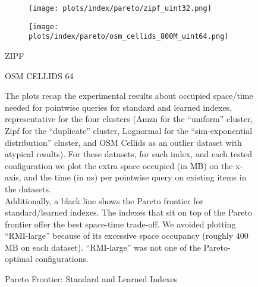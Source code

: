 \documentclass{article}
\begin{document}
\begin{figure}[!htbp]
{\begin{minipage}[t][0.98\textheight][t]{\textwidth}
    \begin{minipage}{0.48\linewidth}
        \begin{figure}[H]
        \texttt{[image: plots/index/pareto/zipf\_uint32.png]}
        \end{figure}
    \end{minipage}
    \begin{minipage}{0.48\linewidth}
        \begin{figure}[H]
        \texttt{[image: plots/index/pareto/osm\_cellids\_800M\_uint64.png]}
        \end{figure}
    \end{minipage}
    \begin{minipage}{0.48\linewidth}
    \begin{center}
        ZIPF
    \end{center}
    \end{minipage}
    \begin{minipage}{0.48\linewidth}
    \begin{center}
        OSM CELLIDS 64
    \end{center}
    \end{minipage}

    \vspace{20px}
    
    \begin{minipage}{\linewidth}
    The plots recap the experimental results about occupied space/time needed for pointwise queries for standard and learned indexes, representative for the four clusters (Amzn for the ``uniform'' cluster, Zipf for the ``duplicate'' cluster, Lognormal for the ``sim-exponential distribution'' cluster, and OSM Cellids as an outlier dataset with atypical results). For these datasets, for each index, and each tested configuration we plot the extra space occupied (in MB) on the x-axis, and the time (in ns) per pointwise query on existing items in the datasets. \\

    Additionally, a black line shows the Pareto frontier for standard/learned indexes. The indexes that sit on top of the Pareto frontier offer the best space-time trade-off.  
    We avoided plotting ``RMI-large'' because of its excessive space occupancy (roughly 400 MB on each dataset). ``RMI-large'' was not one of the Pareto-optimal configurations.
    \end{minipage}
    \vspace{10px}
\end{minipage}
}
\caption{Pareto Frontier: Standard and Learned Indexes}
\end{figure}
\end{document}

